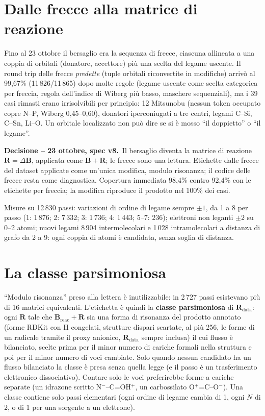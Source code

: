 \documentclass[11pt,a4paper]{report}
\newcommand{\vb}[1]{\bm{#1}}
\newcommand{\decisione}[2]{%
  \par\medskip\noindent\colorbox{ksfondo}{\parbox{\dimexpr\linewidth-2\fboxsep\relax}{%
  \small\textbf{\color{ksblu}Decisione -- #1.}\ #2}}\par\medskip}
\begin{document}
\section{Dalle frecce alla matrice di reazione}
Fino al 23 ottobre il bersaglio era la sequenza di frecce, ciascuna allineata a una coppia di orbitali
(donatore, accettore) più una scelta del legame uscente. Il round trip delle frecce \emph{predette}
(tuple orbitali riconvertite in modifiche) arrivò al 99{,}67\% (11\,826/11\,865) dopo molte regole
(legame uscente come scelta categorica per freccia, regola dell'indice di Wiberg più basso, maschere
sequenziali), ma i 39 casi rimasti erano irrisolvibili per principio: 12 Mitsunobu (nessun token
occupato copre N--P, Wiberg 0{,}45--0{,}60), donatori iperconiugati a tre centri, legami C--Si, C--Sn,
Li--O. Un orbitale localizzato non può dire se si è mosso \enquote{il doppietto} o \enquote{il legame}.

\decisione{23 ottobre, spec v8}{Il bersaglio diventa la matrice di reazione $\vb{R}=\Delta\vb{B}$,
applicata come $\vb{B}+\vb{R}$; le frecce sono una lettura. Etichette dalle frecce del dataset applicate
come un'unica modifica, modulo risonanza; il codice delle frecce resta come diagnostica. Copertura
immediata 98{,}4\% contro 92{,}4\% con le etichette per freccia; la modifica riproduce il prodotto nel
100\% dei casi.}

Misure su 12\,830 passi: variazioni di ordine di legame sempre $\pm1$, da 1 a 8 per passo (1: 1\,876;
2: 7\,332; 3: 1\,736; 4: 1\,443; 5--7: 236); elettroni non leganti $\pm2$ su 0--2 atomi; nuovi legami
8\,904 intermolecolari e 1\,028 intramolecolari a distanza di grafo da 2 a 9: ogni coppia di atomi è
candidata, senza soglia di distanza.

\section{La classe parsimoniosa}
\label{sec:parsimonia}
\enquote{Modulo risonanza} preso alla lettera è inutilizzabile: in 2\,727 passi esistevano più di 16
matrici equivalenti. L'etichetta è quindi la \textbf{classe parsimoniosa} di $\vb{R}_{\mathrm{data}}$:
ogni $\vb{R}$ tale che $\vb{B}_{\mathrm{reac}}+\vb{R}$ sia una forma di risonanza del prodotto annotato
(forme RDKit con H congelati, strutture dispari scartate, al più 256, le forme di un radicale tramite
il proxy anionico, $\vb{R}_{\mathrm{data}}$ sempre inclusa) il cui flusso è bilanciato, scelte prima per
il minor numero di cariche formali nella struttura e poi per il minor numero di voci cambiate. Solo
quando nessun candidato ha un flusso bilanciato la classe è presa senza quella legge (e il passo è un
trasferimento elettronico dissociativo). Contare solo le voci preferirebbe forme a cariche separate
(un idrazone scritto N$^-$--C=OH$^+$, un carbossilato O$^+$=C--O$^-$). Una classe contiene solo passi
elementari (ogni ordine di legame cambia di 1, ogni $N$ di 2, o di 1 per una sorgente a un elettrone).
\end{document}
